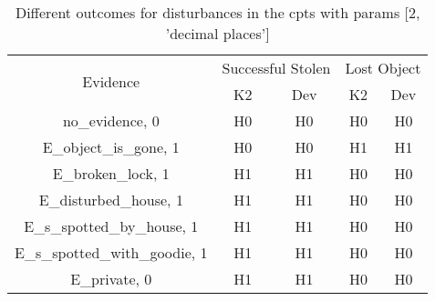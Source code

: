 \begin{table}\begin{tabular}{c|cc|cc}\toprule\multirow{2}{*}{Evidence} & \multicolumn{2}{c}{Successful Stolen} & \multicolumn{2}{c}{Lost Object} \\& {K2} & {Dev} & {K2} & {Dev} \\\midrule
no\_evidence, 0 & H0&H0&H0&H0\\E\_object\_is\_gone, 1 & H0&H0&H1&H1\\E\_broken\_lock, 1 & H1&H1&H0&H0\\E\_disturbed\_house, 1 & H1&H1&H0&H0\\E\_s\_spotted\_by\_house, 1 & H1&H1&H0&H0\\E\_s\_spotted\_with\_goodie, 1 & H1&H1&H0&H0\\E\_private, 0 & H1&H1&H0&H0\\\bottomrule\end{tabular}\caption{Different outcomes for disturbances in the cpts with params [2, 'decimal places']}\end{table}